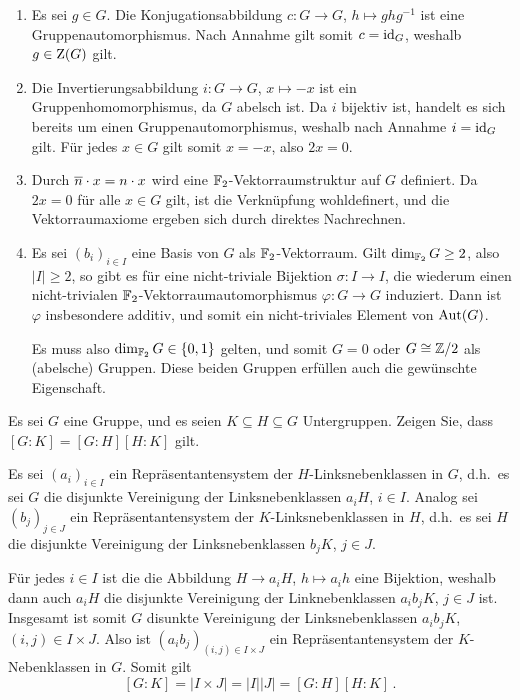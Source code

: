 \begin{solution}
  \begin{enumerate}
    \item
      Es sei $g \in G$.
      Die Konjugationsabbildung $c \colon G \to G$, $h \mapsto ghg^{-1}$ ist eine Gruppenautomorphismus.
      Nach Annahme gilt somit $c = \operatorname{id}_G$, weshalb $g \in \operatorname{Z}(G)$ gilt.
    \item
      Die Invertierungsabbildung $i \colon G \to G$, $x \mapsto -x$ ist ein Gruppenhomomorphismus, da $G$ abelsch ist.
      Da $i$ bijektiv ist, handelt es sich bereits um einen Gruppenautomorphismus, weshalb nach Annahme $i = \operatorname{id}_G$ gilt.
      Für jedes $x \in G$ gilt somit $x = -x$, also $2x = 0$.
    \item
      Durch $\overline{n} \cdot x = n \cdot x$ wird eine $\mathbb{F}_2$-Vektorraumstruktur auf $G$ definiert.
      Da $2x = 0$ für alle $x \in G$ gilt, ist die Verknüpfung wohldefinert, und die Vektorraumaxiome ergeben sich durch direktes Nachrechnen.
    \item
      Es sei $(b_i)_{i \in I}$ eine Basis von $G$ als $\mathbb{F}_2$-Vektorraum.
      Gilt $\dim_{\mathbb{F}_2} G \geq 2$, also $|I| \geq 2$, so gibt es für eine nicht-triviale Bijektion $\sigma \colon I \to I$, die wiederum einen nicht-trivialen $\mathbb{F}_2$-Vektorraumautomorphismus $\varphi \colon G \to G$ induziert.
      Dann ist $\varphi$ insbesondere additiv, und somit ein nicht-triviales Element von $\operatorname{Aut}(G)$.
      
      Es muss also $\dim_{\mathbb{F}_2} G \in \{0, 1\}$ gelten, und somit $G = 0$ oder $G \cong \mathbb{Z}/2$ als (abelsche) Gruppen.
      Diese beiden Gruppen erfüllen auch die gewünschte Eigenschaft.
  \end{enumerate}
\end{solution}


\begin{question}[subtitle = Multiplikativität des Index]
  Es sei $G$ eine Gruppe, und es seien $K \subseteq H \subseteq G$ Untergruppen.
  Zeigen Sie, dass $[G : K] = [G : H][H : K]$ gilt.
\end{question}


\begin{solution}
  Es sei $(a_i)_{i \in I}$ ein Repräsentantensystem der $H$-Linksnebenklassen in $G$, d.h.\ es sei $G$ die disjunkte Vereinigung der Linksnebenklassen $a_i H$, $i \in I$.
  Analog sei $(b_j)_{j \in J}$ ein Repräsentantensystem der $K$-Linksnebenklassen in $H$, d.h.\ es sei $H$ die disjunkte Vereinigung der Linksnebenklassen $b_j K$, $j \in J$.
  
  Für jedes $i \in I$ ist die die Abbildung $H \to a_i H$, $h \mapsto a_i h$ eine Bijektion, weshalb dann auch $a_i H$ die disjunkte Vereinigung der Linknebenklassen $a_i b_j K$, $j \in J$ ist.
  Insgesamt ist somit $G$ disunkte Vereinigung der Linksnebenklassen $a_i b_j K$, $(i,j) \in I \times J$.
  Also ist $(a_i b_j)_{(i,j) \in I \times J}$ ein Repräsentantensystem der $K$-Nebenklassen in $G$.
  Somit gilt
  \[
      [G : K]
    = |I \times J|
    = |I| |J|
    = [G : H] [H : K] \,.
  \]
\end{solution}


